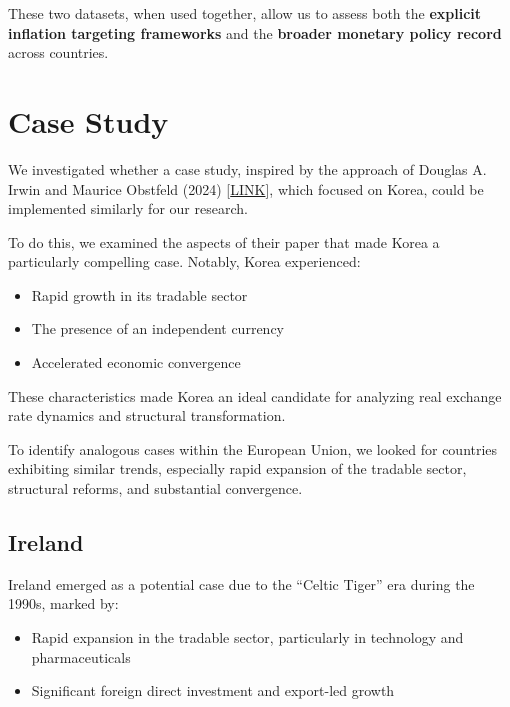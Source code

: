 \documentclass[
  11pt,
]{article}
\providecommand{\tightlist}{%
  \setlength{\itemsep}{0pt}\setlength{\parskip}{0pt}}
\begin{document}
These two datasets, when used together, allow us to assess both the
\textbf{explicit inflation targeting frameworks} and the \textbf{broader
monetary policy record} across countries.

\section{Case Study}\label{case-study}

We investigated whether a case study, inspired by the approach of
Douglas A. Irwin and Maurice Obstfeld (2024)
{[}\href{https://www.nber.org/papers/w32769}{LINK}{]}, which focused on
Korea, could be implemented similarly for our research.

To do this, we examined the aspects of their paper that made Korea a
particularly compelling case. Notably, Korea experienced:

\begin{itemize}
\tightlist
\item
  Rapid growth in its tradable sector\\
\item
  The presence of an independent currency\\
\item
  Accelerated economic convergence
\end{itemize}

These characteristics made Korea an ideal candidate for analyzing real
exchange rate dynamics and structural transformation.

To identify analogous cases within the European Union, we looked for
countries exhibiting similar trends, especially rapid expansion of the
tradable sector, structural reforms, and substantial convergence.

\subsection{Ireland}\label{ireland}

Ireland emerged as a potential case due to the ``Celtic Tiger'' era
during the 1990s, marked by:

\begin{itemize}
\tightlist
\item
  Rapid expansion in the tradable sector, particularly in technology and
  pharmaceuticals\\
\item
  Significant foreign direct investment and export-led growth
\end{itemize}
\end{document}
